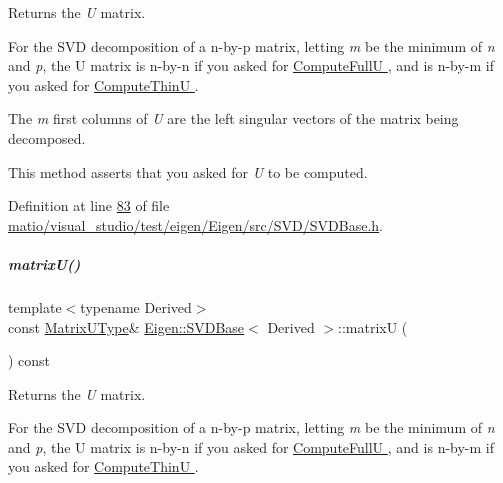 \begin{DoxyReturn}{Returns}
the {\itshape U} matrix.
\end{DoxyReturn}
For the S\+VD decomposition of a n-\/by-\/p matrix, letting {\itshape m} be the minimum of {\itshape n} and {\itshape p}, the U matrix is n-\/by-\/n if you asked for \hyperlink{group__enums_ggae3e239fb70022eb8747994cf5d68b4a9a2b4f91ca5859a4159dbfe8090043817f}{Compute\+FullU }, and is n-\/by-\/m if you asked for \hyperlink{group__enums_ggae3e239fb70022eb8747994cf5d68b4a9af8c742a1aa87773e165eae406c9ccaf8}{Compute\+ThinU }.

The {\itshape m} first columns of {\itshape U} are the left singular vectors of the matrix being decomposed.

This method asserts that you asked for {\itshape U} to be computed. 

Definition at line \hyperlink{matio_2visual__studio_2test_2eigen_2_eigen_2src_2_s_v_d_2_s_v_d_base_8h_source_l00083}{83} of file \hyperlink{matio_2visual__studio_2test_2eigen_2_eigen_2src_2_s_v_d_2_s_v_d_base_8h_source}{matio/visual\+\_\+studio/test/eigen/\+Eigen/src/\+S\+V\+D/\+S\+V\+D\+Base.\+h}.

\mbox{\label{group___s_v_d___module_afc7fe1546b0f6e1801b86f22f5664cb8}} 
\subparagraph{\texorpdfstring{matrix\+U()}{matrixU()}\hspace{0.1cm}{\footnotesize\ttfamily [2/2]}}
{\footnotesize\ttfamily template$<$typename Derived$>$ \\
const \hyperlink{group___core___module}{Matrix\+U\+Type}\& \hyperlink{group___s_v_d___module_class_eigen_1_1_s_v_d_base}{Eigen\+::\+S\+V\+D\+Base}$<$ Derived $>$\+::matrixU (\begin{DoxyParamCaption}{ }\end{DoxyParamCaption}) const\hspace{0.3cm}{\ttfamily [inline]}}

\begin{DoxyReturn}{Returns}
the {\itshape U} matrix.
\end{DoxyReturn}
For the S\+VD decomposition of a n-\/by-\/p matrix, letting {\itshape m} be the minimum of {\itshape n} and {\itshape p}, the U matrix is n-\/by-\/n if you asked for \hyperlink{group__enums_ggae3e239fb70022eb8747994cf5d68b4a9a2b4f91ca5859a4159dbfe8090043817f}{Compute\+FullU }, and is n-\/by-\/m if you asked for \hyperlink{group__enums_ggae3e239fb70022eb8747994cf5d68b4a9af8c742a1aa87773e165eae406c9ccaf8}{Compute\+ThinU }.


